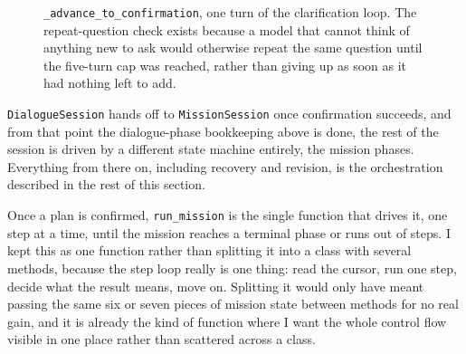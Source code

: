 \begin{figure}[htbp]
  \centering
  \caption{\texttt{\_advance\_to\_confirmation}, one turn of the clarification loop. The repeat-question check exists because a model that cannot think of anything new to ask would otherwise repeat the same question until the five-turn cap was reached, rather than giving up as soon as it had nothing left to add.}
  \label{fig:flow-clarify}
\end{figure}

\texttt{DialogueSession} hands off to \texttt{MissionSession} once
confirmation succeeds, and from that point the dialogue-phase bookkeeping
above is done, the rest of the session is driven by a different state
machine entirely, the mission phases. Everything from there on, including
recovery and revision, is the orchestration described in the rest of this
section.

\label{ssec:mission_loop}

Once a plan is confirmed, \texttt{run\_mission} is the single function that
drives it, one step at a time, until the mission reaches a terminal phase
or runs out of steps. I kept this as one function rather than splitting it
into a class with several methods, because the step loop really is one
thing: read the cursor, run one step, decide what the result means, move
on. Splitting it would only have meant passing the same six or seven pieces
of mission state between methods for no real gain, and it is already the
kind of function where I want the whole control flow visible in one place
rather than scattered across a class.

